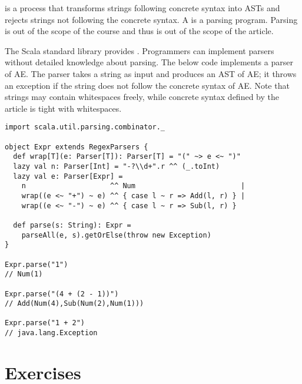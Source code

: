  is a process that transforms strings following concrete syntax
into ASTs and rejects strings not following the concrete syntax. A 
is a parsing program. Parsing is out of the scope of the course and thus is out
of the scope of the article.

The Scala standard library provides . Programmers can
implement parsers without detailed knowledge about parsing. The below code
implements a parser of AE. The parser takes a string as input and produces an AST
of AE; it throws an exception if the string does not follow the concrete syntax
of AE. Note that strings may contain whitespaces freely, while concrete syntax
defined by the article is tight with whitespaces.

\begin{verbatim}
import scala.util.parsing.combinator._

object Expr extends RegexParsers {
  def wrap[T](e: Parser[T]): Parser[T] = "(" ~> e <~ ")"
  lazy val n: Parser[Int] = "-?\\d+".r ^^ (_.toInt)
  lazy val e: Parser[Expr] =
    n                    ^^ Num                         |
    wrap((e <~ "+") ~ e) ^^ { case l ~ r => Add(l, r) } |
    wrap((e <~ "-") ~ e) ^^ { case l ~ r => Sub(l, r) }

  def parse(s: String): Expr =
    parseAll(e, s).getOrElse(throw new Exception)
}

Expr.parse("1")
// Num(1)

Expr.parse("(4 + (2 - 1))")
// Add(Num(4),Sub(Num(2),Num(1)))

Expr.parse("1 + 2")
// java.lang.Exception
\end{verbatim}

\section{Exercises}
